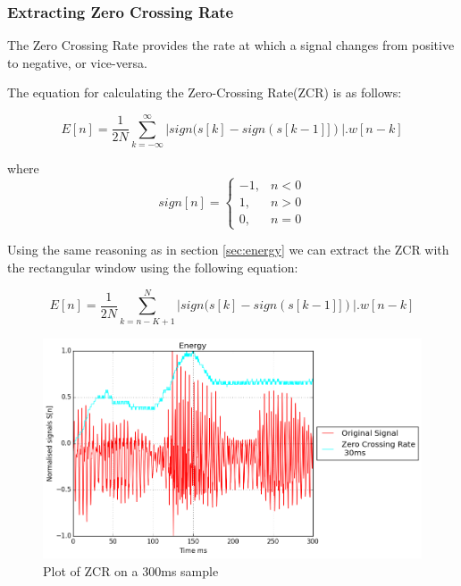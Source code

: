 \documentclass[a4paper]{article}
\begin{document}
\subsubsection{Extracting Zero Crossing Rate}

The Zero Crossing Rate provides the rate at which a signal changes from
positive to negative, or vice-versa.

The equation for calculating the Zero-Crossing Rate(ZCR) is as follows:

\begin{equation}
 E[n] = \frac{1}{2N}\sum_{k=-\infty}^{\infty}|sign(s[k] - sign(s[k-1]])|.w[n-k]
\end{equation}

where
\begin{equation}
sign[n] =
    \begin{cases}
        -1, & n  < 0\\
         1, & n  > 0\\
         0, & n  = 0
    \end{cases}
\end{equation}

Using the same reasoning as in section \ref{sec:energy} we can extract the
ZCR with the rectangular window using the following equation:

\begin{equation}
 E[n] = \frac{1}{2N}\sum_{k=n-K+1}^{N}|sign(s[k] - sign(s[k-1]])|.w[n-k]
\end{equation}


\begin{figure}[H]
\begin{center}
\includegraphics[width=\textwidth, height=\textheight, keepaspectratio]{images/zcr.png}
\caption{Plot of ZCR on a 300ms sample}
\end{center}
\end{figure}
\end{document}
